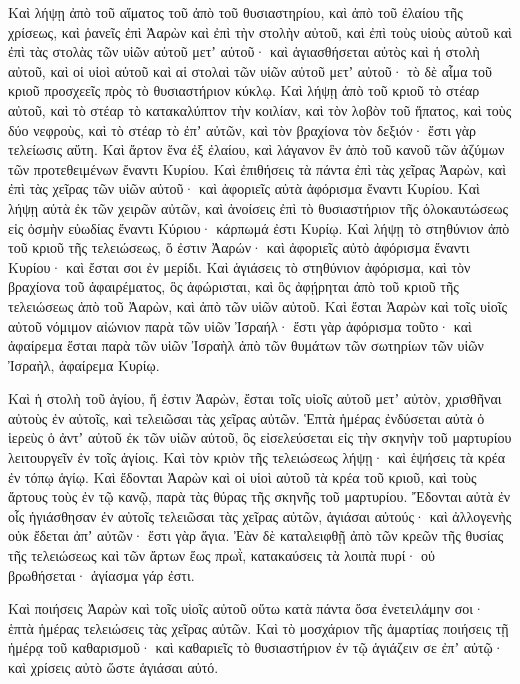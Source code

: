 {Καὶ λήψῃ ἀπὸ τοῦ αἵματος τοῦ ἀπὸ τοῦ θυσιαστηρίου, καὶ ἀπὸ τοῦ ἐλαίου τῆς χρίσεως, καὶ ῥανεῖς ἐπὶ Ἀαρὼν καὶ ἐπὶ τὴν στολὴν αὐτοῦ, καὶ ἐπὶ τοὺς υἱοὺς αὐτοῦ καὶ ἐπὶ τὰς στολὰς τῶν υἱῶν αὐτοῦ μετʼ αὐτοῦ· καὶ ἁγιασθήσεται αὐτὸς καὶ ἡ στολὴ αὐτοῦ, καὶ οἱ υἱοὶ αὐτοῦ καὶ αἱ στολαὶ τῶν υἱῶν αὐτοῦ μετʼ αὐτοῦ· τὸ δὲ αἷμα τοῦ κριοῦ προσχεεῖς πρὸς τὸ θυσιαστήριον κύκλῳ.
Καὶ λήψῃ ἀπὸ τοῦ κριοῦ τὸ στέαρ αὐτοῦ, καὶ τὸ στέαρ τὸ κατακαλύπτον τὴν κοιλίαν, καὶ τὸν λοβὸν τοῦ ἥπατος, καὶ τοὺς δύο νεφροὺς, καὶ τὸ στέαρ τὸ ἐπʼ αὐτῶν, καὶ τὸν βραχίονα τὸν δεξιόν· ἔστι γὰρ τελείωσις αὕτη.
Καὶ ἄρτον ἕνα ἐξ ἐλαίου, καὶ λάγανον ἓν ἀπὸ τοῦ κανοῦ τῶν ἀζύμων τῶν προτεθειμένων ἔναντι Κυρίου.
Καὶ ἐπιθήσεις τὰ πάντα ἐπὶ τὰς χεῖρας Ἀαρὼν, καὶ ἐπὶ τὰς χεῖρας τῶν υἱῶν αὐτοῦ· καὶ ἀφοριεῖς αὐτὰ ἀφόρισμα ἔναντι Κυρίου.
Καὶ λήψῃ αὐτὰ ἐκ τῶν χειρῶν αὐτῶν, καὶ ἀνοίσεις ἐπὶ τὸ θυσιαστήριον τῆς ὁλοκαυτώσεως εἰς ὀσμὴν εὐωδίας ἔναντι Κύριου· κάρπωμά ἐστι Κυρίῳ.
Καὶ λήψῃ τὸ στηθύνιον ἀπὸ τοῦ κριοῦ τῆς τελειώσεως, ὅ ἐστιν Ἀαρών· καὶ ἀφοριεῖς αὐτὸ ἀφόρισμα ἔναντι Κυρίου· καὶ ἔσται σοι ἐν μερίδι.
Καὶ ἁγιάσεις τὸ στηθύνιον ἀφόρισμα, καὶ τὸν βραχίονα τοῦ ἀφαιρέματος, ὃς ἀφώρισται, καὶ ὃς ἀφῄρηται ἀπὸ τοῦ κριοῦ τῆς τελειώσεως ἀπὸ τοῦ Ἀαρὼν, καὶ ἀπὸ τῶν υἱῶν αὐτοῦ.
Καὶ ἔσται Ἀαρὼν καὶ τοῖς υἱοῖς αὐτοῦ νόμιμον αἰώνιον παρὰ τῶν υἱῶν Ἰσραήλ· ἔστι γὰρ ἀφόρισμα τοῦτο· καὶ ἀφαίρεμα ἕσται παρὰ τῶν υἱῶν Ἰσραὴλ ἀπὸ τῶν θυμάτων τῶν σωτηρίων τῶν υἱῶν Ἰσραὴλ, ἀφαίρεμα Κυρίῳ.
\par }{\PP {}Καὶ ἡ στολὴ τοῦ ἁγίου, ἥ ἐστιν Ἀαρὼν, ἔσται τοῖς υἱοῖς αὐτοῦ μετʼ αὐτὸν, χρισθῆναι αὐτοὺς ἐν αὐτοῖς, καὶ τελειῶσαι τὰς χεῖρας αὐτῶν.
Ἑπτὰ ἡμέρας ἐνδύσεται αὐτὰ ὁ ἱερεὺς ὁ ἀντʼ αὐτοῦ ἐκ τῶν υἱῶν αὐτοῦ, ὃς εἰσελεύσεται εἰς τὴν σκηνὴν τοῦ μαρτυρίου λειτουργεῖν ἐν τοῖς ἁγίοις.
Καὶ τὸν κριὸν τῆς τελειώσεως λήψῃ· καὶ ἑψήσεις τὰ κρέα ἐν τόπῳ ἁγίῳ.
Καὶ ἔδονται Ἀαρὼν καὶ οἱ υἱοὶ αὐτοῦ τὰ κρέα τοῦ κριοῦ, καὶ τοὺς ἄρτους τοὺς ἐν τῷ κανῷ, παρὰ τὰς θύρας τῆς σκηνῆς τοῦ μαρτυρίου.
Ἔδονται αὐτὰ ἐν οἷς ἡγιάσθησαν ἐν αὐτοῖς τελειῶσαι τὰς χεῖρας αὐτῶν, ἁγιάσαι αὐτούς· καὶ ἀλλογενὴς οὐκ ἔδεται ἀπʼ αὐτῶν· ἔστι γὰρ ἅγια.
Ἐὰν δὲ καταλειφθῇ ἀπὸ τῶν κρεῶν τῆς θυσίας τῆς τελειώσεως καὶ τῶν ἄρτων ἕως πρωῒ, κατακαύσεις τὰ λοιπὰ πυρί· οὐ βρωθήσεται· ἁγίασμα γάρ ἐστι.
\par }{\PP {}Καὶ ποιήσεις Ἀαρὼν καὶ τοῖς υἱοῖς αὐτοῦ οὕτω κατὰ πάντα ὅσα ἐνετειλάμην σοι· ἑπτὰ ἡμέρας τελειώσεις τὰς χεῖρας αὐτῶν.
Καὶ τὸ μοσχάριον τῆς ἁμαρτίας ποιήσεις τῇ ἡμέρᾳ τοῦ καθαρισμοῦ· καὶ καθαριεῖς τὸ θυσιαστήριον ἐν τῷ ἁγιάζειν σε ἐπʼ αὐτῷ· καὶ χρίσεις αὐτὸ ὥστε ἁγιάσαι αὐτό.
}

